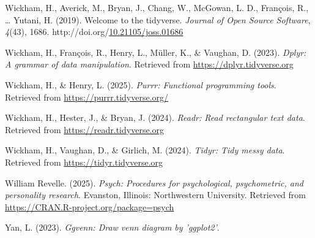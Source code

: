 \documentclass[
  english,
  man,floatsintext]{apa6}
\newlength{\cslhangindent}
\newenvironment{CSLReferences}[2] %
 {\begin{list}{}{%
  \setlength{\itemindent}{0pt}
  \setlength{\leftmargin}{0pt}
  \setlength{\parsep}{0pt}
  \ifodd #1
   \setlength{\leftmargin}{\cslhangindent}
   \setlength{\itemindent}{-1\cslhangindent}
  \fi
  \setlength{\itemsep}{#2\baselineskip}}}
 {\end{list}}
\begin{document}
\begin{CSLReferences}{1}{0}
Wickham, H., Averick, M., Bryan, J., Chang, W., McGowan, L. D., François, R., \ldots{} Yutani, H. (2019). Welcome to the {tidyverse}. \emph{Journal of Open Source Software}, \emph{4}(43), 1686. http://doi.org/\href{https://doi.org/10.21105/joss.01686}{10.21105/joss.01686}

Wickham, H., François, R., Henry, L., Müller, K., \& Vaughan, D. (2023). \emph{Dplyr: A grammar of data manipulation}. Retrieved from \url{https://dplyr.tidyverse.org}

Wickham, H., \& Henry, L. (2025). \emph{Purrr: Functional programming tools}. Retrieved from \url{https://purrr.tidyverse.org/}

Wickham, H., Hester, J., \& Bryan, J. (2024). \emph{Readr: Read rectangular text data}. Retrieved from \url{https://readr.tidyverse.org}

Wickham, H., Vaughan, D., \& Girlich, M. (2024). \emph{Tidyr: Tidy messy data}. Retrieved from \url{https://tidyr.tidyverse.org}

William Revelle. (2025). \emph{Psych: Procedures for psychological, psychometric, and personality research}. Evanston, Illinois: Northwestern University. Retrieved from \url{https://CRAN.R-project.org/package=psych}

Yan, L. (2023). \emph{Ggvenn: Draw venn diagram by 'ggplot2'}.

\end{CSLReferences}
\end{document}
